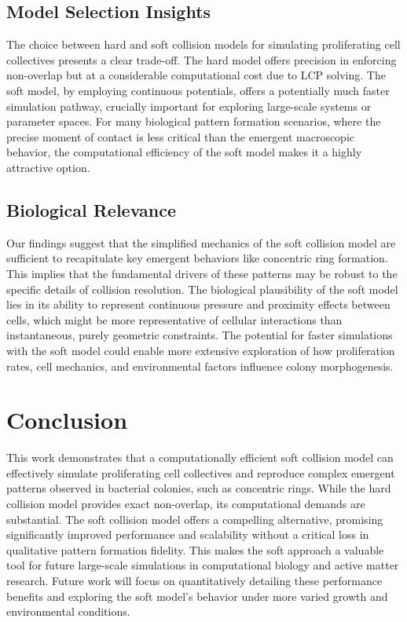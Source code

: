 \documentclass[conference]{IEEEtran}
\begin{document}
\subsection{Model Selection Insights}


The choice between hard and soft collision models for simulating proliferating cell collectives presents a clear trade-off. The hard model offers precision in enforcing non-overlap but at a considerable computational cost due to LCP solving. The soft model, by employing continuous potentials, offers a potentially much faster simulation pathway, crucially important for exploring large-scale systems or parameter spaces. For many biological pattern formation scenarios, where the precise moment of contact is less critical than the emergent macroscopic behavior, the computational efficiency of the soft model makes it a highly attractive option.

\subsection{Biological Relevance}

Our findings suggest that the simplified mechanics of the soft collision model are sufficient to recapitulate key emergent behaviors like concentric ring formation. This implies that the fundamental drivers of these patterns may be robust to the specific details of collision resolution. The biological plausibility of the soft model lies in its ability to represent continuous pressure and proximity effects between cells, which might be more representative of cellular interactions than instantaneous, purely geometric constraints. The potential for faster simulations with the soft model could enable more extensive exploration of how proliferation rates, cell mechanics, and environmental factors influence colony morphogenesis.

\newpage

\section{Conclusion}

This work demonstrates that a computationally efficient soft collision model can effectively simulate proliferating cell collectives and reproduce complex emergent patterns observed in bacterial colonies, such as concentric rings. While the hard collision model provides exact non-overlap, its computational demands are substantial. The soft collision model offers a compelling alternative, promising significantly improved performance and scalability without a critical loss in qualitative pattern formation fidelity. This makes the soft approach a valuable tool for future large-scale simulations in computational biology and active matter research. Future work will focus on quantitatively detailing these performance benefits and exploring the soft model's behavior under more varied growth and environmental conditions.

\newpage
\tableofcontents




\end{document}
